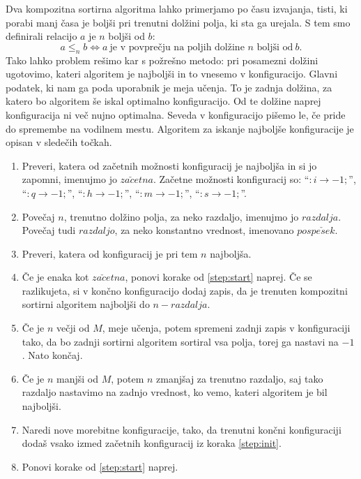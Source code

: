 \documentclass[a4paper,oneside,10pt]{article}
\newcommand{\lra}{\ensuremath{\longrightarrow}}
\begin{document}
Dva kompozitna sortirna algoritma lahko primerjamo po času izvajanja, tisti, ki porabi manj
časa je boljši pri trenutni dolžini polja, ki sta ga urejala.
S tem smo definirali relacijo $a$ je $n$ boljši od $b$:
\[ a \leq_n b \Leftrightarrow a\ \text{je v povprečju na poljih dolžine $n$ boljši
od}\ b.\]
Tako lahko problem rešimo kar s požrešno metodo: 
pri posamezni dolžini ugotovimo, kateri algoritem je najboljši in to vnesemo
v konfiguracijo. Glavni podatek, ki nam ga poda uporabnik je meja učenja. To je zadnja
dolžina, za katero bo algoritem še iskal optimalno konfiguracijo. Od te dolžine naprej
konfiguracija ni več nujno optimalna. Seveda v konfiguracijo pišemo le, če pride do 
spremembe na vodilnem mestu. Algoritem za iskanje najboljše konfiguracije je opisan v
sledečih točkah.
\begin{enumerate}
  \item \label{step:init}Preveri, katera od začetnih možnosti konfiguracij je najboljša in
    si jo zapomni, imenujmo jo $za\check{c}etna$. Začetne možnosti konfiguracij so:
    ``$:i \lra -1;$'', ``$:q \lra -1;$'', ``$:h \lra -1;$'',
    ``$:m \lra -1;$'', ``$:s \lra -1;$''.
  \item \label{step:start}Povečaj $n$, trenutno dolžino polja, za neko razdaljo, imenujmo
    jo $razdalja$. Povečaj tudi $razdaljo$, za neko konstantno vrednost, imenovano
    $pospe\check{s}ek$.
  \item Preveri, katera od konfiguracij je pri tem $n$ najboljša.
  \item \label{step:check}Če je enaka kot $za\check{c}etna$, ponovi korake od \ref{step:start} 
    naprej. Če se razlikujeta, si v končno konfiguracijo dodaj zapis, da je
    trenuten kompozitni sortirni algoritem najboljši do $n - razdalja$.
  \item Če je $n$ večji od $M$, meje učenja, potem spremeni zadnji zapis v konfiguraciji
    tako, da bo zadnji sortirni algoritem sortiral vsa polja, torej ga nastavi na $-1$.
    Nato končaj.
  \item Če je $n$ manjši od $M$, potem $n$ zmanjšaj za trenutno razdaljo, saj
    tako razdaljo nastavimo na zadnjo vrednost, ko vemo, kateri algoritem je bil
    najboljši.
  \item Naredi nove morebitne konfiguracije, tako, da trenutni končni konfiguraciji dodaš
    vsako izmed začetnih konfiguracij iz koraka \ref{step:init}.
  \item Ponovi korake od \ref{step:start} naprej.
\end{enumerate}
\end{document}
